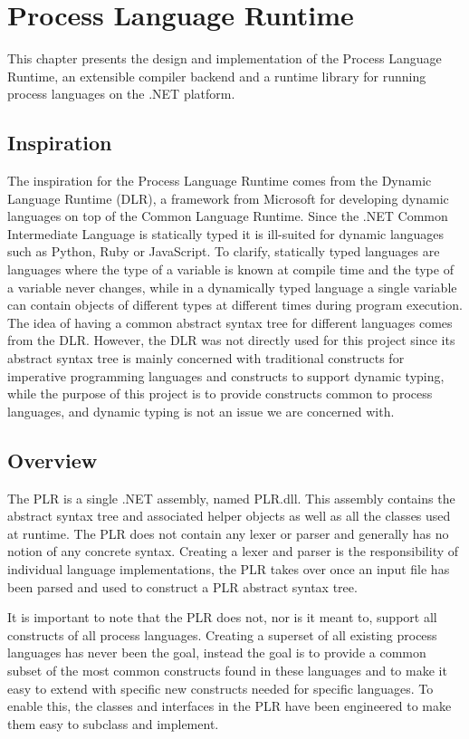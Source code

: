 \chapter{Process Language Runtime}

	This chapter presents the design and implementation of the Process Language 
	Runtime, an extensible compiler backend and a runtime library for running 	
	process languages on the .NET platform. 

\section{Inspiration}

	The inspiration for the Process Language Runtime comes from the Dynamic 
	Language Runtime \cite{dlr} (DLR), a framework from Microsoft for 	
	developing dynamic languages on top of the Common Language Runtime. Since 
	the .NET Common Intermediate Language is statically typed it is ill-suited
	for dynamic languages such as Python, Ruby or JavaScript. To clarify, 
	statically typed languages are languages where the type of a variable is 
	known at compile time and the type of a variable never changes, while in a 
	dynamically typed language a single variable can contain objects of 	
	different types at different times during program execution. The idea of 
	having a common abstract syntax tree for different languages comes from the 
	DLR. However, the DLR was not directly used for this project since its 
	abstract syntax tree is mainly concerned with traditional constructs for 
	imperative programming languages and constructs to support dynamic typing, 
	while the purpose of this project is to provide constructs common to process 
	languages, and dynamic typing is not an issue we are concerned with.

\section{Overview}

	The PLR is a single .NET assembly, named PLR.dll. This assembly contains the 
	abstract syntax tree and associated helper objects as well as all the 
	classes used at runtime. The PLR does not contain any lexer or parser and 
	generally has no notion of any concrete syntax. Creating a lexer and parser 
	is the responsibility of individual language implementations, the PLR takes 
	over once an input file has been parsed and used to construct a PLR abstract 
	syntax tree. 
	
	It is important to note that the PLR does not, nor is it meant 
	to, support all constructs of all process languages. Creating a superset of 
	all existing process languages has never been the goal, instead the goal is 
	to provide a common subset of the most common constructs found in these 
	languages and to make it easy to extend with specific new constructs needed 
	for specific languages. To enable this, the classes and interfaces in the 
	PLR have been engineered to make them easy to subclass and implement.
	
